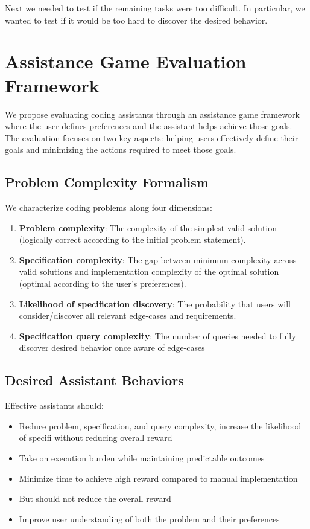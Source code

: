 \documentclass{article}
\begin{document}
Next we needed to test if the remaining tasks were too difficult. In particular, we wanted to test if it would be too hard to discover the desired behavior.

\section{Assistance Game Evaluation Framework}

We propose evaluating coding assistants through an assistance game framework where the user defines preferences and the assistant helps achieve those goals. The evaluation focuses on two key aspects: helping users effectively define their goals and minimizing the actions required to meet those goals.

\subsection{Problem Complexity Formalism}

We characterize coding problems along four dimensions:
\begin{enumerate}
    \item \textbf{Problem complexity}: The complexity of the simplest valid solution (logically correct according to the initial problem statement).
    \item \textbf{Specification complexity}: The gap between minimum complexity across valid solutions and implementation complexity of the optimal solution (optimal according to the user's preferences).
    \item \textbf{Likelihood of specification discovery}: The probability that users will consider/discover all relevant edge-cases and requirements.
    \item \textbf{Specification query complexity}: The number of queries needed to fully discover desired behavior once aware of edge-cases
\end{enumerate}

\subsection{Desired Assistant Behaviors}

Effective assistants should:
\begin{itemize}
    \item Reduce problem, specification, and query complexity, increase the likelihood of specifi without reducing overall reward
    \item Take on execution burden while maintaining predictable outcomes
    \item Minimize time to achieve high reward compared to manual implementation
    \item But should not reduce the overall reward
    \item Improve user understanding of both the problem and their preferences
\end{itemize}
\end{document}
